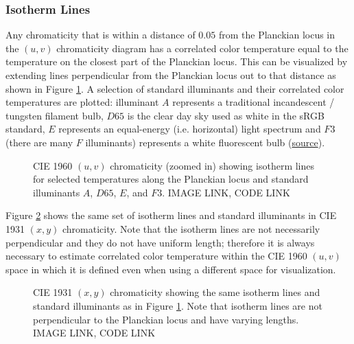 \documentclass{article}
\newif\ifinvert
\begin{document}
\subsubsection{Isotherm Lines} %

Any chromaticity that is within a distance of $0.05$ from the Planckian locus in the $(u,v)$ chromaticity diagram has a correlated color temperature equal to the temperature on the closest part of the Planckian locus.  This can be visualized by extending lines perpendicular from the Planckian locus out to that distance as shown in Figure \ref{fig:isotherm_lines_zoom}.  A selection of standard illuminants and their correlated color temperatures are plotted: illuminant $A$ represents a traditional incandescent / tungsten filament bulb, $D65$ is the clear day sky used as white in the sRGB standard, $E$ represents an equal-energy (i.e. horizontal) light spectrum and $F3$ (there are many $F$ illuminants) represents a white fluorescent bulb (\href{https://en.wikipedia.org/wiki/Standard_illuminant}{source}).

\begin{figure} %
    \ifinvert
        
    \else
        
    \fi
    \caption{CIE 1960 $(u,v)$ chromaticity (zoomed in) showing isotherm lines for selected temperatures along the Planckian locus and standard illuminants $A$, $D65$, $E$, and $F3$.  IMAGE LINK, CODE LINK}\label{fig:isotherm_lines_zoom}
\end{figure}

Figure \ref{fig:cie_1931_isotherm} shows the same set of isotherm lines and standard illuminants in CIE 1931 $(x,y)$ chromaticity.  Note that the isotherm lines are not necessarily perpendicular and they do not have uniform length; therefore it is always necessary to estimate correlated color temperature within the CIE 1960 $(u,v)$ space in which it is defined even when using a different space for visualization.

\begin{figure} %
    \ifinvert
        
    \else
        
    \fi
    \caption{CIE 1931 $(x,y)$ chromaticity showing the same isotherm lines and standard illuminants as in Figure \ref{fig:isotherm_lines_zoom}.  Note that isotherm lines are not perpendicular to the Planckian locus and have varying lengths.  IMAGE LINK, CODE LINK}\label{fig:cie_1931_isotherm}
\end{figure}
\end{document}
